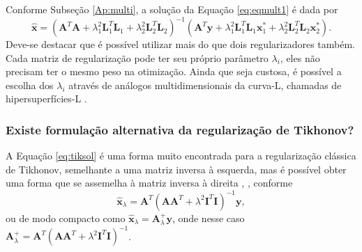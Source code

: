 Conforme Subseção \ref{Ap:multi}, a solução da Equação \eqref{eq:eqmult1} é dada por
\begin{equation}
\hat{\mathbf{x}} =\left( \mathbf{A}^T \mathbf{A} + \lambda_1^2 \mathbf{L}_1^T \mathbf{L}_1 + \lambda_2^2 \mathbf{L}_2^T \mathbf{L}_2 \right)^{-1} \left(\mathbf{A}^T \mathbf{y} + \lambda_1^2 \mathbf{L}_1^T \mathbf{L}_1 \mathbf{x}^*_1 + \lambda_2^2 \mathbf{L}_2^T \mathbf{L}_2 \mathbf{x}^*_2\right).
\label{eq:eqmult2}
\end{equation}
Deve-se destacar que é possível utilizar mais do que dois regularizadores também. Cada matriz de regularização pode ter seu próprio parâmetro $\lambda_i$, eles não precisam ter o mesmo peso na otimização. Ainda que seja custosa, é possível a escolha dos $\lambda_i$ através de análogos multidimensionais da curva-L, chamadas de hipersuperfícies-L \cite{Belge_2002}. 


\subsubsection{Existe formulação alternativa da regularização de Tikhonov?}

A Equação \eqref{eq:tiksol} é uma forma muito encontrada para a regularização clássica de Tikhonov, semelhante a uma matriz inversa à esquerda, mas é possível obter uma forma que se assemelha à matriz inversa à direita \cite[pág. 223]{engl1996regularization}, \cite[pág. 79]{kaipio2005statistical}, conforme
\begin{equation}
\hat{\mathbf{x}}_{\lambda} =\mathbf{A}^T \left( \mathbf{A} \mathbf{A}^T + \lambda^2 \mathbf{I}^T \mathbf{I} \right)^{-1} \mathbf{y},  
\label{eq:tiksolx}
\end{equation}
ou de modo compacto como $\hat{\mathbf{x}}_{\lambda} = \mathbf{A}^+_{\lambda} \mathbf{y}$, onde nesse caso $\mathbf{A}^+_{\lambda} =\mathbf{A}^T \left( \mathbf{A}\mathbf{A}^T + \lambda^2 \mathbf{I}^T \mathbf{I} \right)^{-1}$. 

